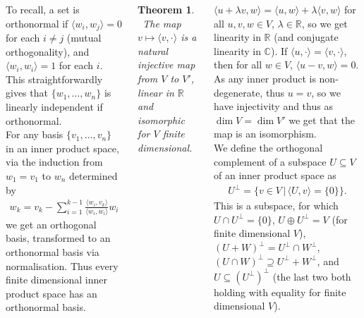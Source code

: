 \documentclass{tikzposter} %
\newtheorem{theorem}{Theorem}
\begin{document}
\begin{columns}
{       To recall, a set is orthonormal if $\langle w_{i}, w_{j} \rangle = 0$ for each $i \neq j$ (mutual orthogonality), and $\langle w_{i}, w_{i} \rangle = 1$ for each $i$. This straightforwardly gives that $\{w_{1}, \dots, w_{n}\}$ is linearly independent if orthonormal. \\

       For any basis $\{v_{1}, \dots, v_{n}\}$ in an inner product space, via the induction from $w_{1} = v_{1}$ to $w_{n}$ determined by
       \begin{align*}
         w_{k} = v_{k} - \sum_{i=1}^{k-1} \frac{\langle w_{i}, v_{k} \rangle } {\langle w_{i}, w_{i} \rangle} w_{i}
       \end{align*}
       we get an orthogonal basis, transformed to an orthonormal basis via normalisation. Thus every finite dimensional inner product space has an orthonormal basis. \\

       \begin{theorem}
       \ The map $v \mapsto \langle v, \cdot \rangle$ is a natural injective map from $V$ to $V'$, linear in $\mathbb{R}$ and isomorphic for $V$ finite dimensional.
       \end{theorem}
       \hphantom{}

       $\langle u + \lambda v, w \rangle = \langle u , w \rangle + \lambda \langle v, w \rangle$ for all $u, v, w \in V$, $\lambda \in \mathbb{R}$, so we get linearity in $\mathbb{R}$ (and conjugate linearity in $\mathbb{C}$). If $\langle u, \cdot \rangle = \langle v, \cdot \rangle$, then for all $w \in V$, $\langle u - v, w \rangle = 0$. As any inner product is non-degenerate, thus $u = v$, so we have injectivity and thus as $\dim V = \dim V'$ we get that the map is an isomorphism. \\

       We define the orthogonal complement of a subspace $U \subseteq V$ of an inner product space as
       \begin{align*}
         U^{\bot} = \{v \in V \,|\, \langle U, v \rangle = \{0\}\}.
       \end{align*}
       This is a subspace, for which $U \cap U^{\bot} = \{0\}$, $U \oplus U^{\bot} = V$ (for finite dimensional $V$), $(U + W)^{\bot} = U^{\bot} \cap W^{\bot}$, $(U \cap W)^{\bot} \supseteq U^{\bot} + W^{\bot}$, and $U \subseteq (U^{\bot})^{\bot}$ (the last two both holding with equality for finite dimensional $V$). \\

}
\end{columns}
\end{document}
